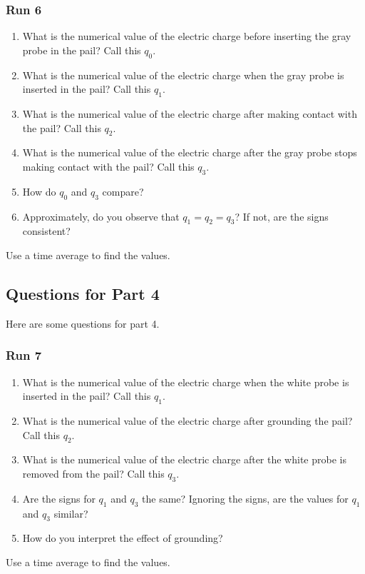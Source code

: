 \subsubsection{Run 6}
\begin{enumerate}
	\item What is the numerical value of the electric charge before inserting the gray probe in the pail? Call this $q_{0}$.
	\item What is the numerical value of the electric charge when the gray probe is inserted in the pail? Call this $q_{1}$.
	\item What is the numerical value of the electric charge after making contact with the pail? Call this $q_{2}$.
	\item What is the numerical value of the electric charge after the gray probe stops making contact with the pail? Call this $q_{3}$.
	\item How do $q_{0}$ and $q_{3}$ compare?
	\item Approximately, do you observe that $q_{1} = q_{2} = q_{3}$? If not, are the signs consistent?
\end{enumerate}
Use a time average to find the values.
\subsection{Questions for Part 4}
Here are some questions for part 4.
\subsubsection{Run 7}
\begin{enumerate}
	\item What is the numerical value of the electric charge when the white probe is inserted in the pail? Call this $q_{1}$.
	\item What is the numerical value of the electric charge after grounding the pail? Call this $q_{2}$.
	\item What is the numerical value of the electric charge after the white probe is removed from the pail? Call this $q_{3}$.
	\item Are the signs for $q_{1}$ and $q_{3}$ the same? Ignoring the signs, are the values for $q_{1}$ and $q_{3}$ similar?
	\item How do you interpret the effect of grounding?
\end{enumerate}
Use a time average to find the values.
